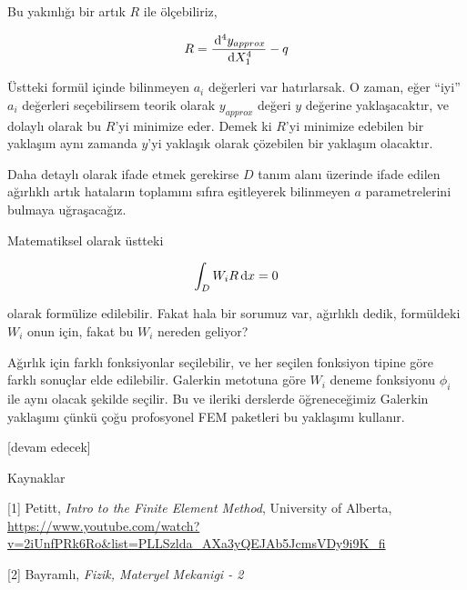 \documentclass[12pt,fleqn]{article}\usepackage{../../common}
\begin{document}
Bu yakınlığı bir artık $R$ ile ölçebiliriz,

$$
R = \frac{\,\mathrm{d}^4 y_{approx}}{\,\mathrm{d} X_1^4} - q 
$$

Üstteki formül içinde bilinmeyen $a_i$ değerleri var hatırlarsak. O zaman, eğer
``iyi'' $a_i$ değerleri seçebilirsem teorik olarak $y_{approx}$ değeri $y$
değerine yaklaşacaktır, ve dolaylı olarak bu $R$'yi minimize eder. Demek ki
$R$'yi minimize edebilen bir yaklaşım aynı zamanda $y$'yi yaklaşık olarak
çözebilen bir yaklaşım olacaktır. 

Daha detaylı olarak ifade etmek gerekirse $D$ tanım alanı üzerinde ifade edilen
ağırlıklı artık hataların toplamını sıfıra eşitleyerek bilinmeyen $a$
parametrelerini bulmaya uğraşacağız.

Matematiksel olarak üstteki

$$
\int_D W_i R \,\mathrm{d} x = 0
$$

olarak formülize edilebilir. Fakat hala bir sorumuz var, ağırlıklı dedik,
formüldeki $W_i$ onun için, fakat bu $W_i$ nereden geliyor?

Ağırlık için farklı fonksiyonlar seçilebilir, ve her seçilen fonksiyon tipine
göre farklı sonuçlar elde edilebilir. Galerkin metotuna göre $W_i$ deneme
fonksiyonu $\phi_i$ ile aynı olacak şekilde seçilir. Bu ve ileriki derslerde
öğreneceğimiz Galerkin yaklaşımı çünkü çoğu profosyonel FEM paketleri bu
yaklaşımı kullanır.





[devam edecek]

Kaynaklar

[1] Petitt, {\em Intro to the Finite Element Method}, University of Alberta,
    \url{https://www.youtube.com/watch?v=2iUnfPRk6Ro&list=PLLSzlda_AXa3yQEJAb5JcmsVDy9i9K_fi}

[2] Bayramlı, {\em Fizik, Materyel Mekanigi - 2}
    
\end{document}
